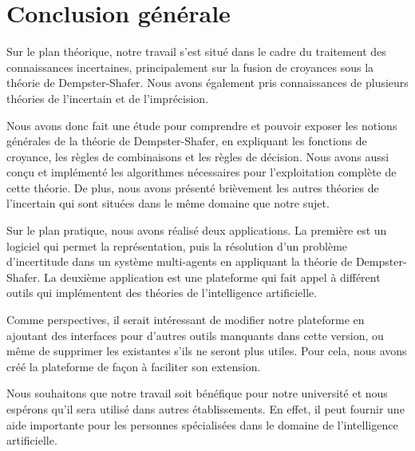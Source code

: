 {}
\chapter*{Conclusion générale}

Sur le plan théorique, notre travail s'est situé dans le cadre du traitement des connaissances incertaines,
principalement sur la fusion de croyances sous la théorie de Dempster-Shafer. Nous avons également pris connaissances
de plusieurs théories de l'incertain et de l'imprécision.

Nous avons donc fait une étude pour comprendre et pouvoir exposer les notions générales de la théorie de Dempster-Shafer,
en expliquant les fonctions de croyance, les règles de combinaisons et les règles de décision. 
Nous avons aussi conçu et implémenté les algorithmes nécessaires pour l'exploitation complète de cette théorie. De plus,
nous avons présenté brièvement les autres théories de l'incertain qui sont situées dans le même domaine que notre sujet.

Sur le plan pratique, nous avons réalisé deux applications. La première est un logiciel qui permet la représentation,
puis la résolution d'un problème d'incertitude dans un système multi-agents en appliquant la théorie de Dempster-Shafer.
La deuxième application est une plateforme qui fait appel à différent outils qui implémentent des théories de
l'intelligence artificielle.

Comme perspectives, il serait intéressant de modifier notre plateforme en ajoutant des interfaces pour d'autres outils
manquants dans cette version, ou même de supprimer les existantes s'ils ne seront plus utiles. Pour cela, nous avons créé
la plateforme de façon à faciliter son extension.

Nous souhaitons que notre travail soit bénéfique pour notre université et nous espérons qu'il sera utilisé dans autres
établissements. En effet, il peut fournir une aide importante pour les personnes spécialisées dans le domaine de
l'intelligence artificielle.